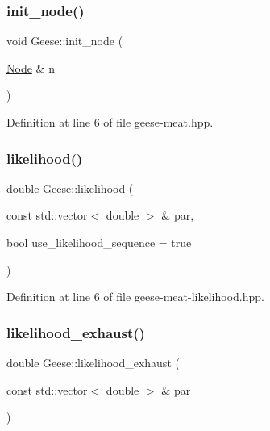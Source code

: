 \mbox{\label{class_geese_a3855898a556e2ac1d30529d3bc35f13a}} 
\subsubsection{\texorpdfstring{init\+\_\+node()}{init\_node()}}
{\footnotesize\ttfamily void Geese\+::init\+\_\+node (\begin{DoxyParamCaption}\item[{\hyperlink{class_node}{Node} \&}]{n }\end{DoxyParamCaption})\hspace{0.3cm}{\ttfamily [inline]}}



Definition at line 6 of file geese-\/meat.\+hpp.

\mbox{\label{class_geese_a930b8c710a6be9c4f6ad94d50afc0512}} 
\subsubsection{\texorpdfstring{likelihood()}{likelihood()}}
{\footnotesize\ttfamily double Geese\+::likelihood (\begin{DoxyParamCaption}\item[{const std\+::vector$<$ double $>$ \&}]{par,  }\item[{bool}]{use\+\_\+likelihood\+\_\+sequence = {\ttfamily true} }\end{DoxyParamCaption})\hspace{0.3cm}{\ttfamily [inline]}}



Definition at line 6 of file geese-\/meat-\/likelihood.\+hpp.

\mbox{\label{class_geese_af2d4bac42cc7c8287fb6853d50882115}} 
\subsubsection{\texorpdfstring{likelihood\+\_\+exhaust()}{likelihood\_exhaust()}}
{\footnotesize\ttfamily double Geese\+::likelihood\+\_\+exhaust (\begin{DoxyParamCaption}\item[{const std\+::vector$<$ double $>$ \&}]{par }\end{DoxyParamCaption})\hspace{0.3cm}{\ttfamily [inline]}}



